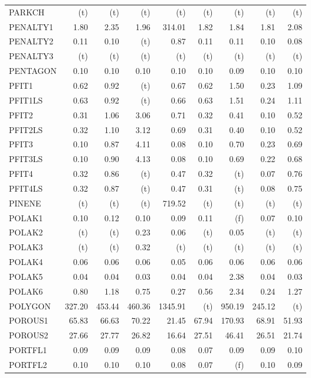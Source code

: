 \documentclass[11pt,twoside]{article}
\begin{document}
{\begin{longtable}[c]{|l|r|r|r|r|r|r|r|r|}
PARKCH & (t) & (t) & (t) & (t) & (t) & (t) & (t) & (t) \\
PENALTY1 & 1.80 & 2.35 & 1.96 & 314.01 & 1.82 & 1.84 & 1.81 & 2.08 \\
PENALTY2 & 0.11 & 0.10 & (t) & 0.87 & 0.11 & 0.11 & 0.10 & 0.08 \\
PENALTY3 & (t) & (t) & (t) & (t) & (t) & (t) & (t) & (t) \\
PENTAGON & 0.10 & 0.10 & 0.10 & 0.10 & 0.10 & 0.09 & 0.10 & 0.10 \\
PFIT1 & 0.62 & 0.92 & (t) & 0.67 & 0.62 & 1.50 & 0.23 & 1.09 \\
PFIT1LS & 0.63 & 0.92 & (t) & 0.66 & 0.63 & 1.51 & 0.24 & 1.11 \\
PFIT2 & 0.31 & 1.06 & 3.06 & 0.71 & 0.32 & 0.41 & 0.10 & 0.52 \\
PFIT2LS & 0.32 & 1.10 & 3.12 & 0.69 & 0.31 & 0.40 & 0.10 & 0.52 \\
PFIT3 & 0.10 & 0.87 & 4.11 & 0.08 & 0.10 & 0.70 & 0.23 & 0.69 \\
PFIT3LS & 0.10 & 0.90 & 4.13 & 0.08 & 0.10 & 0.69 & 0.22 & 0.68 \\
PFIT4 & 0.32 & 0.86 & (t) & 0.47 & 0.32 & (t) & 0.07 & 0.76 \\
PFIT4LS & 0.32 & 0.87 & (t) & 0.47 & 0.31 & (t) & 0.08 & 0.75 \\
PINENE & (t) & (t) & (t) & 719.52 & (t) & (t) & (t) & (t) \\
POLAK1 & 0.10 & 0.12 & 0.10 & 0.09 & 0.11 & (f) & 0.07 & 0.10 \\
POLAK2 & (t) & (t) & 0.23 & 0.06 & (t) & 0.05 & (t) & (t) \\
POLAK3 & (t) & (t) & 0.32 & (t) & (t) & (t) & (t) & (t) \\
POLAK4 & 0.06 & 0.06 & 0.06 & 0.05 & 0.06 & 0.06 & 0.06 & 0.06 \\
POLAK5 & 0.04 & 0.04 & 0.03 & 0.04 & 0.04 & 2.38 & 0.04 & 0.03 \\
POLAK6 & 0.80 & 1.18 & 0.75 & 0.27 & 0.56 & 2.34 & 0.24 & 1.27 \\
POLYGON & 327.20 & 453.44 & 460.36 & 1345.91 & (t) & 950.19 & 245.12 & (t) \\
POROUS1 & 65.83 & 66.63 & 70.22 & 21.45 & 67.94 & 170.93 & 68.91 & 51.93 \\
POROUS2 & 27.66 & 27.77 & 26.82 & 16.64 & 27.51 & 46.41 & 26.51 & 21.74 \\
PORTFL1 & 0.09 & 0.09 & 0.09 & 0.08 & 0.07 & 0.09 & 0.09 & 0.10 \\
PORTFL2 & 0.10 & 0.10 & 0.10 & 0.08 & 0.07 & (f) & 0.10 & 0.09 \\

\end{longtable}}
\end{document}
